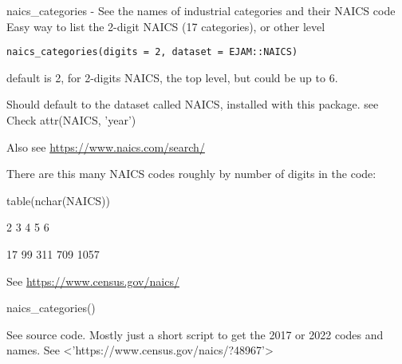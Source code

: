 \documentclass[a4paper]{book}
\begin{document}
%
\begin{Description}\relax
naics\_categories - See the names of industrial categories and their NAICS code
Easy way to list the 2-digit NAICS (17 categories), or other level
\end{Description}
%
\begin{Usage}
\begin{verbatim}
naics_categories(digits = 2, dataset = EJAM::NAICS)
\end{verbatim}
\end{Usage}
%
\begin{Arguments}
\begin{ldescription}
\item[\code{digits}] default is 2, for 2-digits NAICS, the top level, but could be up to 6.

\item[\code{dataset}] Should default to the dataset called NAICS, installed with this package.
see   Check attr(NAICS, 'year')
\end{ldescription}
\end{Arguments}
%
\begin{Details}\relax
Also see \url{https://www.naics.com/search/}

There are this many NAICS codes roughly by number of digits in the code:

table(nchar(NAICS))

2    3    4    5    6

17   99  311  709 1057

See \url{https://www.census.gov/naics/}
\end{Details}
%
\begin{SeeAlso}\relax
{}  
\end{SeeAlso}
%
\begin{Examples}
\begin{ExampleCode}
 naics_categories()
\end{ExampleCode}
\end{Examples}
%
\begin{Description}\relax
See source code. Mostly just a short script to get the 2017 or 2022 codes and names.
See <'https://www.census.gov/naics/?48967'>
\end{Description}
\end{document}
